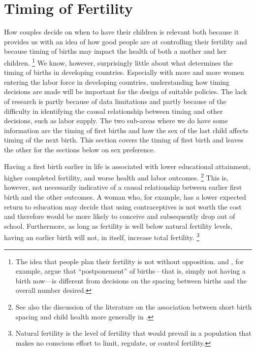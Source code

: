 \documentclass[letterpaper,12pt]{article}
\begin{document}
\section{Timing of Fertility}

How couples decide on when to have their children is relevant both 
because it provides us with an idea of how good people are at controlling 
their fertility and because timing of births may impact the health of both 
a mother and her children.%
\footnote{
The idea that people plan their fertility is not without opposition.
\citet{Timaeus2008} and \citet{Moultrie2012}, for example, argue that
``postponement'' of births---that is, simply not having a birth now---is 
different from decisions on the spacing between births and the overall
number desired.
}
We know, however, surprisingly little about what determines the timing
of births in developing countries.
Especially with more and more women entering the labor force in
developing countries, understanding how timing decisions are made will
be important for the design of suitable policies.
The lack of research is partly because of data limitations and partly
because of the difficulty in identifying the causal relationship between
timing and other decisions, such as labor supply.
The two sub-areas where we do have some information are the timing of
first births and how the sex of the last child affects timing of the next birth.
This section covers the timing of first birth and leaves the other
for the sections below on sex preference.

Having a first birth earlier in life is associated with lower educational 
attainment, higher completed fertility, and worse health and labor outcomes.%
\footnote{
See also the discussion of the literature on the association between short 
birth spacing and child health more generally in \citet{Casterline2016}.
}
This is, however, not necessarily indicative of a causal relationship
between earlier first birth and the other outcomes.
A woman who, for example, has a lower expected return to education may
decide that using contraceptives is not worth the cost and therefore
would be more likely to conceive and subsequently drop out of school.
Furthermore, as long as fertility is well below natural fertility
levels, having an earlier birth will not, in itself, increase total
fertility.%
\footnote{
Natural fertility is the level of fertility that would prevail in a
population that makes no conscious effort to limit, regulate, or control
fertility.}
\end{document}

